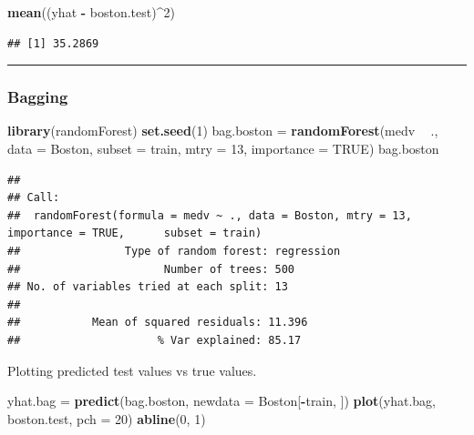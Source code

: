 \documentclass[]{article}
\newenvironment{Shaded}{\begin{snugshade}}{\end{snugshade}}
\newcommand{\DataTypeTok}[1]{\textcolor[rgb]{0.13,0.29,0.53}{#1}}
\newcommand{\DecValTok}[1]{\textcolor[rgb]{0.00,0.00,0.81}{#1}}
\newcommand{\KeywordTok}[1]{\textcolor[rgb]{0.13,0.29,0.53}{\textbf{#1}}}
\newcommand{\NormalTok}[1]{#1}
\newcommand{\OperatorTok}[1]{\textcolor[rgb]{0.81,0.36,0.00}{\textbf{#1}}}
\newcommand{\OtherTok}[1]{\textcolor[rgb]{0.56,0.35,0.01}{#1}}
\newcommand{\StringTok}[1]{\textcolor[rgb]{0.31,0.60,0.02}{#1}}
\begin{document}
\begin{Shaded}
\begin{Highlighting}[]
\KeywordTok{mean}\NormalTok{((yhat }\OperatorTok{-}\StringTok{ }\NormalTok{boston.test)}\OperatorTok{^}\DecValTok{2}\NormalTok{)}
\end{Highlighting}
\end{Shaded}

\begin{verbatim}
## [1] 35.2869
\end{verbatim}

\begin{center}\rule{0.5\linewidth}{\linethickness}\end{center}

\hypertarget{bagging}{%
\subsubsection{Bagging}\label{bagging}}

\begin{Shaded}
\begin{Highlighting}[]
\KeywordTok{library}\NormalTok{(randomForest)}
\KeywordTok{set.seed}\NormalTok{(}\DecValTok{1}\NormalTok{)}
\NormalTok{bag.boston =}\StringTok{ }\KeywordTok{randomForest}\NormalTok{(medv }\OperatorTok{~}\StringTok{ }\NormalTok{., }\DataTypeTok{data =}\NormalTok{ Boston, }\DataTypeTok{subset =}\NormalTok{ train, }\DataTypeTok{mtry =} \DecValTok{13}\NormalTok{, }
    \DataTypeTok{importance =} \OtherTok{TRUE}\NormalTok{)}
\NormalTok{bag.boston}
\end{Highlighting}
\end{Shaded}

\begin{verbatim}
## 
## Call:
##  randomForest(formula = medv ~ ., data = Boston, mtry = 13, importance = TRUE,      subset = train) 
##                Type of random forest: regression
##                      Number of trees: 500
## No. of variables tried at each split: 13
## 
##           Mean of squared residuals: 11.396
##                     % Var explained: 85.17
\end{verbatim}

Plotting predicted test values vs true values.

\begin{Shaded}
\begin{Highlighting}[]
\NormalTok{yhat.bag =}\StringTok{ }\KeywordTok{predict}\NormalTok{(bag.boston, }\DataTypeTok{newdata =}\NormalTok{ Boston[}\OperatorTok{-}\NormalTok{train, ])}
\KeywordTok{plot}\NormalTok{(yhat.bag, boston.test, }\DataTypeTok{pch =} \DecValTok{20}\NormalTok{)}
\KeywordTok{abline}\NormalTok{(}\DecValTok{0}\NormalTok{, }\DecValTok{1}\NormalTok{)}
\end{Highlighting}
\end{Shaded}
\end{document}
